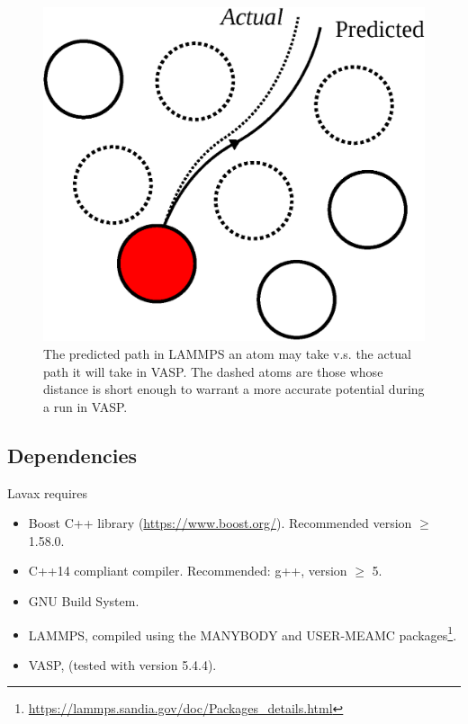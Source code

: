 \documentclass{article}
\begin{document}
\begin{figure}[H]
  \centering
  \includegraphics[scale=0.5]{img/pred.eps}
  \caption{The predicted path in LAMMPS an atom may take v.s. the actual path it will take in VASP. The dashed atoms are those whose distance is short enough to warrant a more accurate potential during a run in VASP.}
  \label{fig:pred}
\end{figure}

\subsection{Dependencies}
Lavax requires
\begin{itemize}
\item Boost C++ library (\url{https://www.boost.org/}). Recommended version $\ge$ 1.58.0.
\item C++14 compliant compiler. Recommended: g++, version $\ge$ 5.
\item GNU Build System.
\item LAMMPS, compiled using the MANYBODY and USER-MEAMC packages\footnote{\url{https://lammps.sandia.gov/doc/Packages_details.html}}.
\item VASP, (tested with version 5.4.4).
\end{itemize}
\end{document}
